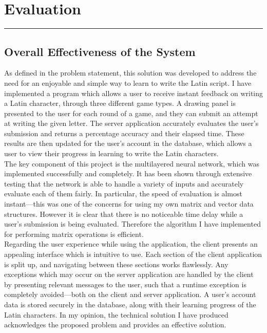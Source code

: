 \documentclass{article}
\begin{document}
\newpage
\section{Evaluation}
\noindent\rule{\textwidth}{0.2pt}
\subsection{Overall Effectiveness of the System}

As defined in the problem statement, this solution was developed to address the need for an enjoyable and simple way to learn to write the Latin script. I have implemented a program which allows a user to receive instant feedback on writing a Latin character, through three different game types. A drawing panel is presented to the user for each round of a game, and they can submit an attempt at writing the given letter. The server application accurately evaluates the user's submission and returns a percentage accuracy and their elapsed time. These results are then updated for the user's account in the database, which allows a user to view their progress in learning to write the Latin characters. \\

The key component of this project is the multilayered neural network, which was implemented successfully and completely. It has been shown through extensive testing that the network is able to handle a variety of inputs and accurately evaluate each of them fairly. In particular, the speed of evaluation is almost instant---this was one of the concerns for using my own matrix and vector data structures. However it is clear that there is no noticeable time delay while a user's submission is being evaluated. Therefore the algorithm I have implemented for performing matrix operations is efficient. \\

Regarding the user experience while using the application, the client presents an appealing interface which is intuitive to use. Each section of the client application is split up, and navigating between these sections works flawlessly. Any exceptions which may occur on the server application are handled by the client by presenting relevant messages to the user, such that a runtime exception is completely avoided---both on the client and server application. A user's account data is stored securely in the database, along with their learning progress of the Latin characters. In my opinion, the technical solution I have produced acknowledges the proposed problem and provides an effective solution.
\end{document}
